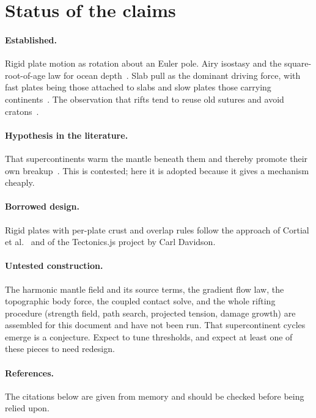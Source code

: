 \documentclass[11pt,a4paper]{article}
\begin{document}
\section{Status of the claims}\label{sec:status}

\paragraph{Established.} Rigid plate motion as rotation about an Euler pole.
Airy isostasy and the square-root-of-age law for ocean depth~\cite{parsons}.
Slab pull as the dominant driving force, with fast plates being those
attached to slabs and slow plates those carrying continents~\cite{forsyth}.
The observation that rifts tend to reuse old sutures and avoid
cratons~\cite{wilson}.

\paragraph{Hypothesis in the literature.} That supercontinents warm the mantle
beneath them and thereby promote their own breakup~\cite{anderson,gurnis}.
This is contested; here it is adopted because it gives a mechanism cheaply.

\paragraph{Borrowed design.} Rigid plates with per-plate crust and overlap
rules follow the approach of Cortial et al.~\cite{cortial} and of the
Tectonics.js project by Carl Davidson.

\paragraph{Untested construction.} The harmonic mantle field and its source
terms, the gradient flow law, the topographic body force, the coupled contact
solve, and the whole rifting procedure (strength field, path search, projected
tension, damage growth) are assembled for this document and have not been
run. That supercontinent cycles emerge is a conjecture. Expect to tune
thresholds, and expect at least one of these pieces to need redesign.

\paragraph{References.} The citations below are given from memory and should
be checked before being relied upon.
\end{document}
